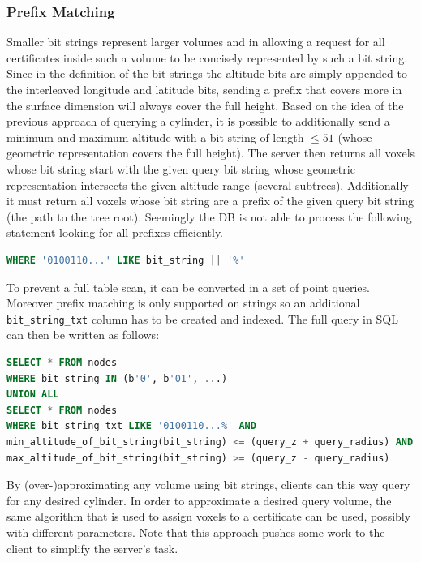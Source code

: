 \documentclass[10pt,conference,compsocconf]{IEEEtran}
\begin{document}
\subsubsection{Prefix Matching}
Smaller bit strings represent larger volumes and in allowing a request for all certificates inside such a volume to be concisely represented by such a bit string.
Since in the definition of the bit strings the altitude bits are simply appended to the interleaved longitude and latitude bits, sending a prefix that covers more in the surface dimension will always cover the full height.
Based on the idea of the previous approach of querying a cylinder, it is possible to additionally send a minimum and maximum altitude with a bit string of length $\leq 51$ (whose geometric representation covers the full height).
The server then returns all voxels whose bit string start with the given query bit string whose geometric representation intersects the given altitude range (several subtrees).
Additionally it must return all voxels whose bit string are a prefix of the given query bit string (the path to the tree root).
Seemingly the DB is not able to process the following statement looking for all prefixes efficiently.
\begin{lstlisting}[language=SQL]
WHERE '0100110...' LIKE bit_string || '%'
\end{lstlisting}

To prevent a full table scan, it can be converted in a set of point queries.
Moreover prefix matching is only supported on strings so an additional \texttt{bit\_string\_txt} column has to be created and indexed.
The full query in SQL can then be written as follows:
\begin{lstlisting}[language=SQL]
SELECT * FROM nodes
WHERE bit_string IN (b'0', b'01', ...)
UNION ALL
SELECT * FROM nodes
WHERE bit_string_txt LIKE '0100110...%' AND
min_altitude_of_bit_string(bit_string) <= (query_z + query_radius) AND
max_altitude_of_bit_string(bit_string) >= (query_z - query_radius)
\end{lstlisting}
By (over-)approximating any volume using bit strings, clients can this way query for any desired cylinder.
In order to approximate a desired query volume, the same algorithm that is used to assign voxels to a certificate can be used, possibly with different parameters.
Note that this approach pushes some work to the client to simplify the server's task.
\end{document}
